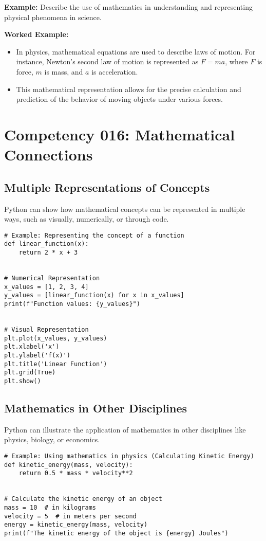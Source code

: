 \documentclass{book}
\begin{document}
\textbf{Example:} Describe the use of mathematics in understanding and representing physical phenomena in science.


\textbf{Worked Example:}
\begin{itemize}
        \item In physics, mathematical equations are used to describe laws of motion. For instance, Newton's second law of motion is represented as \( F = ma \), where \( F \) is force, \( m \) is mass, and \( a \) is acceleration.
        \item This mathematical representation allows for the precise calculation and prediction of the behavior of moving objects under various forces.
\end{itemize}

\section{Competency 016: Mathematical Connections}
\subsection{Multiple Representations of Concepts}
Python can show how mathematical concepts can be represented in multiple ways, such as visually, numerically, or through code.


\begin{lstlisting}[style=pythonstyle]
# Example: Representing the concept of a function
def linear_function(x):
    return 2 * x + 3


# Numerical Representation
x_values = [1, 2, 3, 4]
y_values = [linear_function(x) for x in x_values]
print(f"Function values: {y_values}")


# Visual Representation
plt.plot(x_values, y_values)
plt.xlabel('x')
plt.ylabel('f(x)')
plt.title('Linear Function')
plt.grid(True)
plt.show()
\end{lstlisting}


\subsection{Mathematics in Other Disciplines}
Python can illustrate the application of mathematics in other disciplines like physics, biology, or economics.


\begin{lstlisting}[style=pythonstyle]
# Example: Using mathematics in physics (Calculating Kinetic Energy)
def kinetic_energy(mass, velocity):
    return 0.5 * mass * velocity**2


# Calculate the kinetic energy of an object
mass = 10  # in kilograms
velocity = 5  # in meters per second
energy = kinetic_energy(mass, velocity)
print(f"The kinetic energy of the object is {energy} Joules")
\end{lstlisting}
\end{document}
